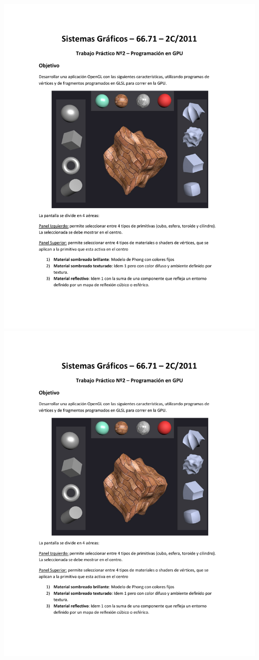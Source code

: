 \documentclass[11pt]{article}
\begin{document}
\begin{center}
\includegraphics[trim = 25mm 20mm 10mm 25mm, clip,height=0.95\textheight,width=1.04\textwidth,page={2}]{tp2-c2-2011.pdf}
\includegraphics[trim = 25mm 20mm 10mm 25mm, clip,height=0.95\textheight,width=1.04\textwidth,page={3}]{tp2-c2-2011.pdf}

\end{center}
\end{document}
